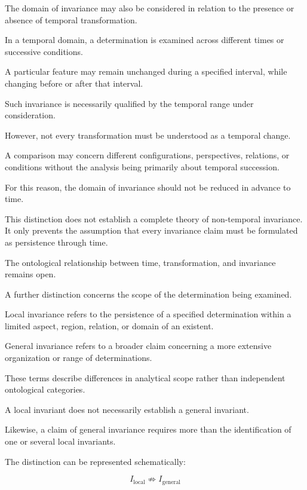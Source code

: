 The domain of invariance may also
be considered in relation to
the presence or absence of
temporal transformation.

In a temporal domain, a determination
is examined across different
times or successive conditions.

A particular feature may remain
unchanged during a specified
interval, while changing before
or after that interval.

Such invariance is necessarily
qualified by the temporal range
under consideration.

However, not every transformation
must be understood as a temporal
change.

A comparison may concern different
configurations, perspectives,
relations, or conditions without
the analysis being primarily
about temporal succession.

For this reason, the domain
of invariance should not be
reduced in advance to time.

This distinction does not establish
a complete theory of non-temporal
invariance. It only prevents
the assumption that every
invariance claim must be
formulated as persistence
through time.

The ontological relationship
between time, transformation,
and invariance remains open.


A further distinction concerns
the scope of the determination
being examined.

Local invariance refers to the
persistence of a specified
determination within a limited
aspect, region, relation, or
domain of an existent.

General invariance refers to
a broader claim concerning
a more extensive organization
or range of determinations.

These terms describe differences
in analytical scope rather than
independent ontological categories.

A local invariant does not
necessarily establish a general
invariant.

Likewise, a claim of general
invariance requires more than
the identification of one or
several local invariants.

The distinction can be represented
schematically:

\[
I_{\mathrm{local}}
\not\Rightarrow
I_{\mathrm{general}}
\]

